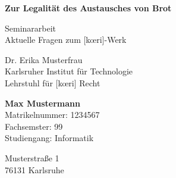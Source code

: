 \begin{titlepage}
\begin{center}
\vspace*{2cm}

\textbf{Zur Legalität des Austausches von Brot}

\vspace{0.5cm}

Seminararbeit \\
Aktuelle Fragen zum [kœri]-Werk

\vspace{2cm}

Dr. Erika Musterfrau \\
Karlsruher Institut für Technologie \\
Lehrstuhl für [kœri] Recht

\vfill

\textbf{Max Mustermann} \\
Matrikelnummer: 1234567 \\
Fachsemster: 99 \\
Studiengang: Informatik

\vspace{1cm}

Musterstraße 1 \\
76131 Karlsruhe

\end{center}
\end{titlepage}